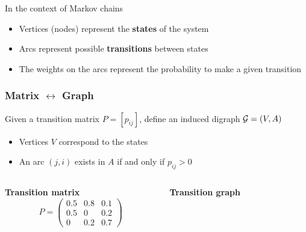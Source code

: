 \documentclass[aspectratio=169]{beamer}\usepackage[]{graphicx}\usepackage[]{xcolor}
\begin{document}
\begin{frame}{In the context of Markov chains}
\begin{itemize}
    \item Vertices (nodes) represent the \textbf{states} of the system
    \vfill
    \item Arcs represent possible \textbf{transitions} between states
    \vfill
    \item The weights on the arcs represent the probability to make a given transition
\end{itemize}
\end{frame}


\begin{frame}
\frametitle{Matrix $\leftrightarrow$ Graph}
    
Given a transition matrix $P = [p_{ij}]$, define an induced digraph $\mathcal{G} = (V, A)$

\begin{itemize}
\item Vertices $V$ correspond to the states
\item An arc $(j, i)$ exists in $A$ if and only if $p_{ij} > 0$
\end{itemize}

\begin{columns}[T]
\begin{column}{.45\textwidth}
  \centering
  \textbf{Transition matrix}
  \[ 
    P = \begin{pmatrix}
              0.5 & 0.8 & 0.1 \\
              0.5 & 0   & 0.2 \\
              0   & 0.2 & 0.7
          \end{pmatrix}
  \]
\end{column}
\begin{column}{.55\textwidth}
\centering
\textbf{Transition graph}
\end{column}
\end{columns}
\end{frame}
\end{document}
